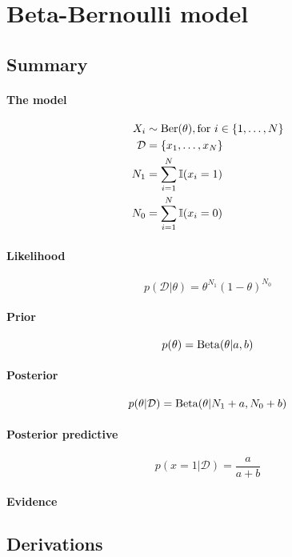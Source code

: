 \section{Beta-Bernoulli model}
\subsection{Summary}
\paragraph{The model}
    \begin{align}
        X_i         &\sim \operatorname{Ber}(\theta), \text{for } i \in \{1, \dotsc, N\} \\
        \mathcal D  &= \{x_1, \dotsc, x_N\} \\
        N_1         &= \sum_{i = 1}^N \mathbb I (x_i = 1) \\
        N_0         &= \sum_{i = 1}^N \mathbb I (x_i = 0)
    \end{align}

\paragraph{Likelihood}
    \begin{equation}
        p(\mathcal D | \theta) = \theta^{N_1} (1 - \theta)^{N_0}
    \end{equation}

\paragraph{Prior}
    \begin{equation}
        p(\theta)   = \operatorname{Beta}(\theta | a, b)
    \end{equation}

\paragraph{Posterior}
    \begin{equation}
        p(\theta | \mathcal D) = \operatorname{Beta}(\theta | N_1 + a, N_0 + b)
    \end{equation}

\paragraph{Posterior predictive}
    \begin{equation}
        p(x = 1 | \mathcal D) = \frac{a}{a + b}
    \end{equation}

\paragraph{Evidence}

\subsection{Derivations}
